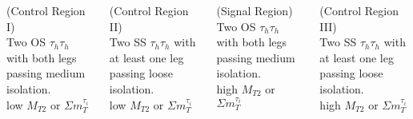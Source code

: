 \documentclass[professionalfont,fleqn]{beamer}
\begin{document}
\begin{footnotesize}
\begin{columns}[c]
\column{0.15\paperwidth}
\column{0.40\paperwidth}
\begin{tcolorbox}
\begin{center}
\color{red} (Control Region I) \\
\color{black} Two OS $\tau_{h}\tau_{h}$ with both legs passing medium isolation.\\
low $M_{T2}$ or $\Sigma m_T^{\tau_i}$
\end{center}
\end{tcolorbox}
\begin{tcolorbox}
\begin{center}
\color{red} (Control Region II) \\
\color{black} Two SS $\tau_{h}\tau_{h}$ with at least one leg passing loose isolation.\\
low $M_{T2}$ or $\Sigma m_T^{\tau_i}$
\end{center}
\end{tcolorbox}
\column{0.40\paperwidth}
\begin{tcolorbox}
\begin{center}
\color{red} (Signal Region) \\
\color{black} Two OS $\tau_{h}\tau_{h}$ with both legs passing medium isolation.\\
high $M_{T2}$ or $\Sigma m_T^{\tau_i}$
\end{center}
\end{tcolorbox}
\begin{tcolorbox}
\begin{center}
\color{red} (Control Region III) \\
\color{black} Two SS $\tau_{h}\tau_{h}$ with at least one leg passing loose isolation.\\
high $M_{T2}$ or $\Sigma m_T^{\tau_i}$
\end{center}
\end{tcolorbox}
\end{columns}
\end{footnotesize}
\end{document}
